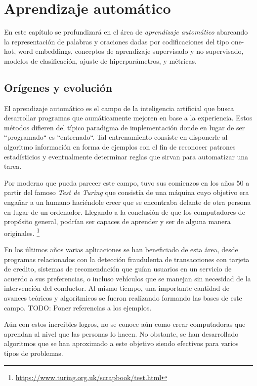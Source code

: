 \chapter{Aprendizaje automático}

En este capítulo se profundizará en el área de \emph{aprendizaje automático}
abarcando la representación de palabras y oraciones dadas por codificaciones del
tipo one-hot, word embeddings, conceptos de aprendizaje supervisado y no
supervisado, modelos de clasificación, ajuste de hiperparámetros, y métricas.

\section{Orígenes y evolución}

El aprendizaje automático es el campo de la inteligencia artificial que busca
desarrollar programas que aumáticamente mejoren en base a la experiencia. Estos
métodos difieren del típico paradigma de implementación donde en lugar de ser
``programado`` es ``entrenado``. Tal entrenamiento consiste en disponerle al
algoritmo información en forma de ejemplos con el fin de reconocer patrones
estadísticios y eventualmente determinar reglas que sirvan para automatizar una
tarea.

Por moderno que pueda parecer este campo, tuvo sus comienzos en los años 50 a
partir del famoso \emph{Test de Turing} que consistía de una máquina cuyo
objetivo era engañar a un humano haciéndole creer que se encontraba delante de
otra persona en lugar de un ordenador. Llegando a la conclusión de que los
computadores de propósito general, podrían ser capaces de aprender y ser de
alguna manera originales.
\footnote{\url{https://www.turing.org.uk/scrapbook/test.html}}

En los últimos años varias aplicaciones se han beneficiado de esta área, desde
programas relacionados con la detección fraudulenta de transacciones con tarjeta
de credito, sistemas de recomendación que guían usuarios en un servicio de
acuerdo a sus preferencias, o incluso vehículos que se manejan sin necesidad de
la intervención del conductor. Al mismo tiempo, una importante cantidad de
avances teóricos y algorítmicos se fueron realizando formando las bases de este
campo. TODO: Poner referencias a los ejemplos.

Aún con estos increibles logros, no se conoce aún como crear computadoras que
aprendan al nivel que las personas lo hacen. No obstante, se han desarrollado
algoritmos que se han aproximado a este objetivo siendo efectivos para varios
tipos de problemas.

